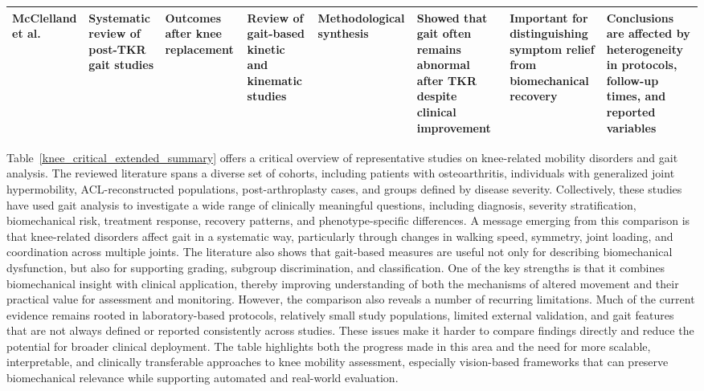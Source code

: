 \documentclass[12pt]{elsarticle}
\begin{document}
{\begin{longtable}{p{1.9cm} p{1.6cm} p{1.9cm} p{1.9cm} p{1.7cm} p{1.9cm} p{2.0cm} p{3.0cm}}
McClelland et al. \cite{mcclelland2007gait}
& Systematic review of post-TKR gait studies
& Outcomes after knee replacement
& Review of gait-based kinetic and kinematic studies
& Methodological synthesis
& Showed that gait often remains abnormal after TKR despite clinical improvement
& Important for distinguishing symptom relief from biomechanical recovery
& Conclusions are affected by heterogeneity in protocols, follow-up times, and reported variables \\
\hline

\end{longtable}
}

Table~\ref{knee_critical_extended_summary} offers a critical overview of representative studies on knee-related mobility disorders and gait analysis. The reviewed literature spans a diverse set of cohorts, including patients with osteoarthritis, individuals with generalized joint hypermobility, ACL-reconstructed populations, post-arthroplasty cases, and groups defined by disease severity. Collectively, these studies have used gait analysis to investigate a wide range of clinically meaningful questions, including diagnosis, severity stratification, biomechanical risk, treatment response, recovery patterns, and phenotype-specific differences. A message emerging from this comparison is that knee-related disorders affect gait in a systematic way, particularly through changes in walking speed, symmetry, joint loading, and coordination across multiple joints. The literature also shows that gait-based measures are useful not only for describing biomechanical dysfunction, but also for supporting grading, subgroup discrimination, and classification. One of the key strengths is that it combines biomechanical insight with clinical application, thereby improving understanding of both the mechanisms of altered movement and their practical value for assessment and monitoring. However, the comparison also reveals a number of recurring limitations. Much of the current evidence remains rooted in laboratory-based protocols, relatively small study populations, limited external validation, and gait features that are not always defined or reported consistently across studies. These issues make it harder to compare findings directly and reduce the potential for broader clinical deployment. The table highlights both the progress made in this area and the need for more scalable, interpretable, and clinically transferable approaches to knee mobility assessment, especially vision-based frameworks that can preserve biomechanical relevance while supporting automated and real-world evaluation.
\end{document}
